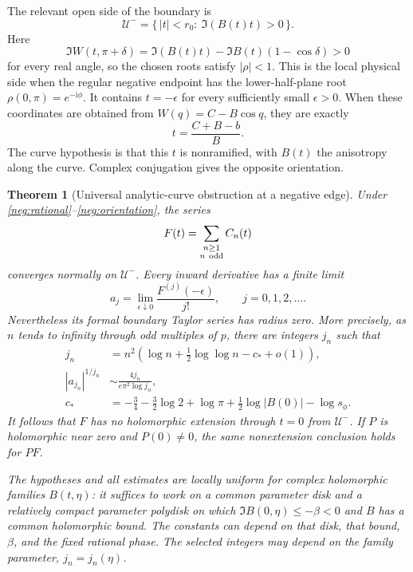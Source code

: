 \documentclass[11pt]{article}
\numberwithin{equation}{section}
\newtheorem{theorem}{Theorem}[section]
\theoremstyle{definition}
\newcommand{\ii}{\mathrm i}
\begin{document}
The relevant open side of the boundary is
\begin{equation}
 \mathcal U^-=\{\,|t|<r_0:\ \Im(B(t)t)>0\,\}.
 \label{neg:physical-side}
\end{equation}
Here
\[
 \Im W(t,\pi+\delta)
   =\Im(B(t)t)-\Im B(t)(1-\cos\delta)>0
 \]
for every real angle, so the chosen roots satisfy \(|\rho|<1\).
This is the local physical side when the regular negative endpoint
has the lower-half-plane root \(\rho(0,\pi)=e^{-\ii\phi}\).
It contains \(t=-\epsilon\) for every sufficiently small
\(\epsilon>0\).  When these coordinates are obtained from
\(W(q)=C-B\cos q\), they are exactly
\[
 t=\frac{C+B-b}{B}.
 \]
The curve hypothesis is that this \(t\) is nonramified, with \(B(t)\)
the anisotropy along the curve. Complex conjugation gives the opposite
orientation.

\begin{theorem}[Universal analytic-curve obstruction at a negative edge]
\label{neg:theorem}
Under \eqref{neg:rational}--\eqref{neg:orientation}, the series
\[
 F(t)=\sum_{\substack{n\ge1\\n\ {\rm odd}}}C_n(t)
 \]
converges normally on \(\mathcal U^-\).  Every inward derivative has
a finite limit
\begin{equation}
 a_j=\lim_{\epsilon\downarrow0}\frac{F^{(j)}(-\epsilon)}{j!},
 \qquad j=0,1,2,\ldots .
 \label{neg:jets}
\end{equation}
Nevertheless its formal boundary Taylor series has radius zero.
More precisely, as \(n\) tends to infinity through odd multiples of
\(p\), there are integers \(j_n\) such that
\begin{align}
 j_n&=n^2\left(\log n+\tfrac12\log\log n-c_*+o(1)\right),
 \label{neg:jn-statement}\\
 |a_{j_n}|^{1/j_n}
   &\sim \frac{4j_n}{e\pi^2\log j_n},
 \label{neg:growth-statement}\\
 c_*&=-\frac34-\frac32\log2+\log\pi
            +\frac12\log|B(0)|-\log s_\phi .
 \label{neg:cstar}
\end{align}
It follows that \(F\) has no holomorphic extension through \(t=0\)
from \(\mathcal U^-\).  If \(P\) is holomorphic near zero and
\(P(0)\ne0\), the same nonextension conclusion holds for \(P F\).

The hypotheses and all estimates are locally uniform for complex
holomorphic families \(B(t,\eta)\): it suffices to work on a common
parameter disk and a relatively compact parameter polydisk on which
\(\Im B(0,\eta)\le-\beta<0\) and \(B\) has a common holomorphic bound.
The constants can depend on that disk, that bound, \(\beta\), and
the fixed rational phase. The selected integers may depend on the
family parameter, \(j_n=j_n(\eta)\).
\end{theorem}
\end{document}
